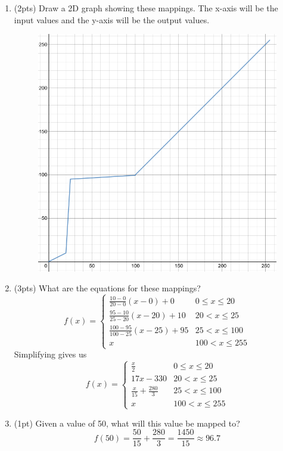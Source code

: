 \documentclass{article}
\begin{document}
\begin{enumerate}
\begin{enumerate}
\item(2pts) Draw a 2D graph showing these mappings.  The x-axis will be the input values and the y-axis will be the output values.
\begin{figure}[h]
    \centering
    \includegraphics[scale=.5]{images/1-3-a.png}
\end{figure}


\item (3pts) What are the equations for these mappings?
$$ f(x) = \begin{cases}
    \frac{10-0}{20-0} (x-0) + 0 & 0 \leq x \leq 20 \\
    \frac{95-10}{25-20}(x-20) + 10 & 20 < x \leq 25 \\
    \frac{100-95}{100-25}(x-25) + 95 & 25 < x \leq 100 \\
    x & 100 < x \leq 255
 \end{cases} $$
Simplifying gives us
$$ f(x) = \begin{cases}
    \frac{x}{2} & 0 \leq x \leq 20 \\
    17x-330 & 20 < x \leq 25 \\
    \frac{x}{15}+\frac{280}{3} & 25 < x \leq 100 \\
    x & 100 < x \leq 255
 \end{cases} $$

\item (1pt) Given a value of 50, what will this value be mapped to?
$$f(50) = \frac{50}{15}+\frac{280}{3} = \frac{1450}{15} \approx 96.7 $$
\end{enumerate}
\end{enumerate}
\end{document}
